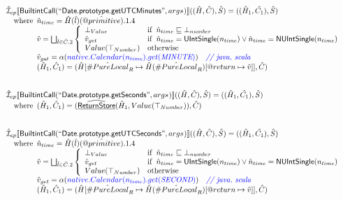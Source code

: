 \documentclass{article}
\makeatletter
\newcommand{\SF}[1]{\mbox{\textsf{#1}}}
\newcommand{\comment}[1]{\textit{#1}}
\newcommand{\wherec}[1]{{\rm where}\begin{array}[t]{l}#1\end{array}}
\newcommand{\ifc}[1]{{\rm if}\begin{array}[t]{l}#1\end{array}}
\newcommand{\owc}{{\rm otherwise}}
\newcommand{\aI}{\hat{\mathcal{I}}}
\newcommand{\lbr}{\llbracket}
\newcommand{\rbr}{\rrbracket}
\newcommand{\ahf}[1]{\widehat{\underline{\sf #1}}}
\newcommand{\varprop}[1]{@#1}
\newcommand{\avarloc}[1]{\hat{\##1}}
\newcommand{\avarprop}[1]{\hat{@#1}}
\def\inblue{\color{blue}}
\def\inblue{\color{blue}}
\makeatother
\begin{document}
\[\begin{array}{l}
\aI _{cp}\lbr \SF{BuiltintCall}(``\SF{Date.prototype.getUTCMinutes}",args_{})\rbr((\hat{H},\hat{C}), \hat{S})
  = ((\hat{H}_1, \hat{C_1}), \hat{S})\\
\quad\wherec{
  \hat{n}_{time} = \hat{H}(\hat{l})(\avarprop{primitive}).1.4\\
  \hat{v} = \bigsqcup_{\hat{l} \in \hat{C}.2} \left\{\begin{array}{ll}
      \bot_{Value} & \ifc{\hat{n}_{time} \sqsubseteq  \bot_{number}}\\
      \hat{v}_{get} &
      \ifc{\hat{n}_{time} = \SF{UIntSingle}(n_{time}) \lor\hat{n}_{time} = \SF{NUIntSingle}(n_{time}) }\\
      Value(\top_{Number}) & \owc
    \end{array}\right.\\
  \hat{v}_{get} = \alpha({\inblue native.Calendar(n_{time}).get(\emph{MINUTE})})
    \quad\comment{{\inblue // java, scala}}\\  
  (\hat{H}_1, \hat{C}_1) = 
    (\hat{H}[\avarloc{PureLocal}_R \mapsto \hat{H}(\avarloc{PureLocal}_R)
      [\varprop{return} \mapsto \hat{v}]], \hat{C})\\
  }\\
\\\\

\aI _{cp}\lbr \SF{BuiltintCall}(``\SF{Date.prototype.getSeconds}",args_{})\rbr((\hat{H},\hat{C}), \hat{S})
  = ((\hat{H}_1, \hat{C_1}), \hat{S})\\
\quad\wherec{
  (\hat{H}_1, \hat{C}_1) = (\ahf{ReturnStore}(\hat{H}_1, Value(\top_{Number})), \hat{C})
  }\\
\\\\

\aI _{cp}\lbr \SF{BuiltintCall}(``\SF{Date.prototype.getUTCSeconds}",args_{})\rbr((\hat{H},\hat{C}), \hat{S})
  = ((\hat{H}_1, \hat{C_1}), \hat{S})\\
\quad\wherec{
  \hat{n}_{time} = \hat{H}(\hat{l})(\avarprop{primitive}).1.4\\
  \hat{v} = \bigsqcup_{\hat{l} \in \hat{C}.2} \left\{\begin{array}{ll}
      \bot_{Value} & \ifc{\hat{n}_{time} \sqsubseteq  \bot_{number}}\\
      \hat{v}_{get} &
      \ifc{\hat{n}_{time} = \SF{UIntSingle}(n_{time}) \lor\hat{n}_{time} = \SF{NUIntSingle}(n_{time}) }\\
      Value(\top_{Number}) & \owc
    \end{array}\right.\\
  \hat{v}_{get} = \alpha({\inblue native.Calendar(n_{time}).get(\emph{SECOND})})
    \quad\comment{{\inblue // java, scala}}\\  
  (\hat{H}_1, \hat{C}_1) = 
    (\hat{H}[\avarloc{PureLocal}_R \mapsto \hat{H}(\avarloc{PureLocal}_R)
      [\varprop{return} \mapsto \hat{v}]], \hat{C})\\
  }\\
\\\\


\end{array}
\]
\end{document}
